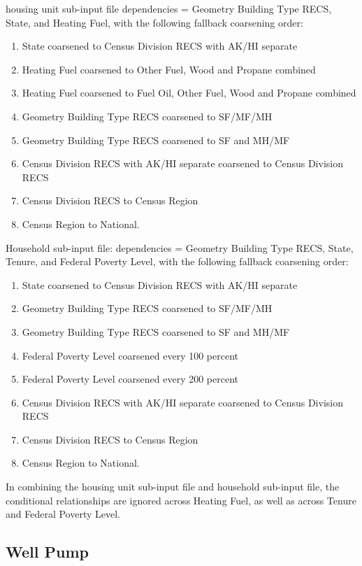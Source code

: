 housing unit sub-input file  dependencies = Geometry Building Type RECS, State, and Heating Fuel, with the following fallback coarsening order:
\begin{enumerate}
    \item State coarsened to Census Division RECS with AK/HI separate 
    \item  Heating Fuel coarsened to Other Fuel, Wood and Propane combined
    \item Heating Fuel coarsened to Fuel Oil, Other Fuel, Wood and Propane combined
    \item Geometry Building Type RECS coarsened to SF/MF/MH
    \item  Geometry Building Type RECS coarsened to SF and MH/MF 
    \item  Census Division RECS with AK/HI separate coarsened to Census Division RECS 
    \item Census Division RECS to Census Region 
    \item Census Region to National.  
\end{enumerate}
Household sub-input file: dependencies = Geometry Building Type RECS, State, Tenure, and Federal Poverty Level, with the following fallback coarsening order:
\begin{enumerate}
    \item State coarsened to Census Division RECS with AK/HI separate 
    \item  Geometry Building Type RECS coarsened to SF/MF/MH 
    \item  Geometry Building Type RECS coarsened to SF and MH/MF 
    \item  Federal Poverty Level coarsened every 100 percent 
    \item Federal Poverty Level coarsened every 200 percent 
    \item Census Division RECS with AK/HI separate coarsened to Census Division RECS 
    \item Census Division RECS to Census Region 
    \item Census Region to National. 
\end{enumerate}
In combining the housing unit sub-input file and household sub-input file, the conditional relationships are ignored across Heating Fuel, as well as across Tenure and Federal Poverty Level.

\subsection{Well Pump}
